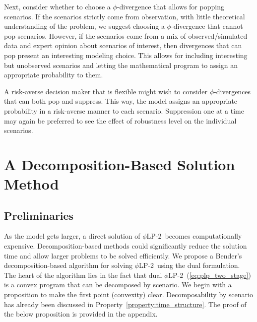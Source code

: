 \documentclass[opre,nonblindrev]{informs3} %
\newcommand{\plp}{$\phi$LP-2}
\begin{document}
Next, consider whether to choose a  $\phi$-divergence that allows for popping scenarios.
If the scenarios strictly come from observation, with little theoretical understanding of the problem, we suggest choosing a $\phi$-divergence that cannot pop scenarios.
However, if the scenarios come from a mix of observed/simulated data and expert opinion about scenarios of interest, then divergences that can pop present an interesting modeling choice.
This allows for including interesting but unobserved scenarios and letting the mathematical program to assign an appropriate probability to them.


A risk-averse decision maker that is flexible might wish to consider $\phi$-divergences that can both pop and suppress. 
This way, the model assigns an appropriate probability in a risk-averse manner to each scenario. 
Suppression one at a time may again be preferred to see the effect of robustness level on the individual scenarios. 



\section{A Decomposition-Based Solution Method}
\label{sec:soln_algorithm}

\subsection{Preliminaries}
\label{ssec:prelim}

As the model gets larger, a direct solution of \plp\ becomes computationally expensive. 
Decomposition-based methods could significantly reduce the solution time and allow larger problems to be solved efficiently. 
We propose a Bender's decomposition-based algorithm for solving \plp\ using the dual formulation. 
The heart of the algorithm lies in the fact that dual \plp\ (\ref{eq:plp_two_stage}) is a convex program that can be decomposed by scenario.
We begin with a proposition to make the first point (convexity) clear. 
Decomposability by scenario has already been discussed in Property~\ref{property:time_structure}. 
The proof of the below proposition is provided in the appendix. 
\end{document}
